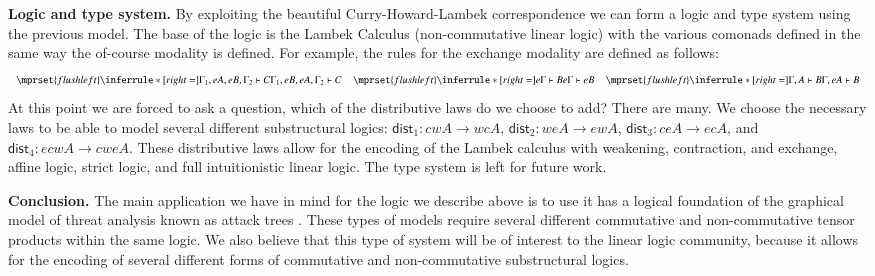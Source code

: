 \documentclass{article}
\let\mto\to
\let\to\relax
\newcommand{\to}{\rightarrow}
\begin{document}
\textbf{Logic and type system.} By exploiting the beautiful
Curry-Howard-Lambek correspondence we can form a logic and type system
using the previous model.  The base of the logic is the Lambek
Calculus (non-commutative linear logic) with the various comonads
defined in the same way the of-course modality is defined.  For
example, the rules for the exchange modality are defined as follows:
\vspace{-7px}
\[
\small
\begin{array}{cccccccccccccc}
  $$\mprset{flushleft}
  \inferrule* [right=] {
    \Gamma_1,eA,eB,\Gamma_2 \vdash C
  }{\Gamma_1,eB,eA,\Gamma_2 \vdash C}
  &
  $$\mprset{flushleft}
  \inferrule* [right=] {
    e\Gamma \vdash B
  }{e\Gamma \vdash eB}
  &
  $$\mprset{flushleft}
  \inferrule* [right=] {
    \Gamma,A \vdash B
  }{\Gamma,eA \vdash B}
\end{array}
\vspace{-7px}
\]
At this point we are forced to ask a question, which of the
distributive laws do we choose to add?  There are many.  We choose the
necessary laws to be able to model several different substructural
logics: $\mathsf{dist}_1 : cwA \mto wcA$, $\mathsf{dist}_2 : weA \mto
ewA$, $\mathsf{dist}_3 : ceA \mto ecA$, and $\mathsf{dist}_4 : ecwA
\mto cweA$.  These distributive laws allow for the encoding of the
Lambek calculus with weakening, contraction, and exchange, affine
logic, strict logic, and full intuitionistic linear logic.  The type
system is left for future work.

\textbf{Conclusion.}  The main application we have in mind for the
logic we describe above is to use it has a logical foundation of the
graphical model of threat analysis known as attack trees
\cite{Eades:2016a}.  These types of models require several different
commutative and non-commutative tensor products within the same logic.
We also believe that this type of system will be of interest to the
linear logic community, because it allows for the encoding of
several different forms of commutative and non-commutative
substructural logics.

\vspace{-15px}
 
\end{document}
